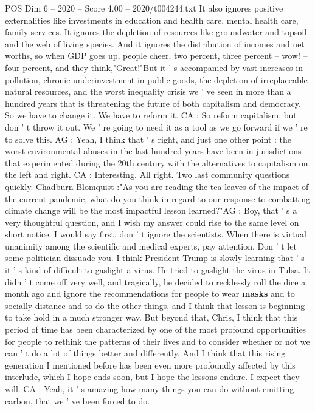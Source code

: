 \begin{textsample}{POS Dim 6 – 2020 – Score 4.00 – 2020/t004244.txt}
It also ignores positive externalities like investments in education and health care, mental health care, family services.
It ignores the depletion of resources like groundwater and topsoil and the web of living species.
And it ignores the distribution of incomes and net worths, so when GDP goes up, people cheer, two percent, three percent -- wow! -- four percent, and they think,"Great!"But it ' s accompanied by vast increases in pollution, chronic underinvestment in public goods, the depletion of irreplaceable natural resources, and the worst inequality crisis we ' ve seen in more than a hundred years that is threatening the future of both capitalism and democracy.
So we have to change it.
We have to reform it.
CA : So reform capitalism, but don ' t throw it out.
We ' re going to need it as a tool as we go forward if we ' re to solve this.
AG : Yeah, I think that ' s right, and just one other point : the worst environmental abuses in the last hundred years have been in jurisdictions that experimented during the 20th century with the alternatives to capitalism on the left and right.
CA : Interesting.
All right.
Two last community questions quickly.
Chadburn Blomquist :"As you are reading the tea leaves of the impact of the current pandemic, what do you think in regard to our response to combatting climate change will be the most impactful lesson learned?"AG : Boy, that ' s a very thoughtful question, and I wish my answer could rise to the same level on short notice.
I would say first, don ' t ignore the scientists.
When there is virtual unanimity among the scientific and medical experts, pay attention.
Don ' t let some politician dissuade you.
I think President Trump is slowly learning that ' s it ' s kind of difficult to gaslight a virus.
He tried to gaslight the virus in Tulsa.
It didn ' t come off very well, and tragically, he decided to recklessly roll the dice a month ago and ignore the recommendations for people to wear \textbf{masks} and to socially distance and to do the other things, and I think that lesson is beginning to take hold in a much stronger way.
But beyond that, Chris, I think that this period of time has been characterized by one of the most profound opportunities for people to rethink the patterns of their lives and to consider whether or not we can ' t do a lot of things better and differently.
And I think that this rising generation I mentioned before has been even more profoundly affected by this interlude, which I hope ends soon, but I hope the lessons endure.
I expect they will.
CA : Yeah, it ' s amazing how many things you can do without emitting carbon, that we ' ve been forced to do.

\end{textsample}
